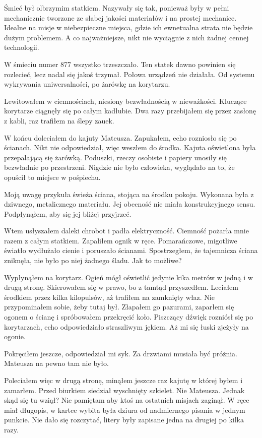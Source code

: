 \divider{}

Śmieć był olbrzymim statkiem. 
Nazywały się tak, ponieważ były w pełni mechanicznie tworzone ze słabej jakości materiałów i na prostej mechanice.
Idealne na misje w niebezpieczne miejsca, gdzie ich ewnetualna strata nie będzie dużym problemem. 
A co najważniejsze, nikt nie wyciągnie z nich żadnej cennej technologii.

W śmieciu numer 877 wszystko trzeszczało. 
Ten statek dawno powinien się rozlecieć, lecz nadal się jakoś trzymał.
Połowa urządzeń nie działała. Od systemu wykrywania uniwersalności, po żarówkę na korytarzu.

Lewitowałem w ciemnościach, niesiony bezwładnością w nieważkości.
Kluczące korytarze ciągnęły się po całym kadłubie.
Dwa razy przebijałem się przez zasłonę z kabli, raz trafiłem na ślepy zauek.

W końcu doleciałem do kajuty Mateusza. 
Zapukałem, echo rozniosło się po ścianach.
Nikt nie odpowiedział, więc weszłem do środka.
Kajuta oświetlona była przepalającą się żarówką.
Poduszki, rzeczy osobiste i papiery unosiły się bezwładnie po przestrzeni.
Nigdzie nie było człowieka, wyglądało na to, że opuścił to miejsce w pośpiechu.

Moją uwagę przykuła świeża ściana, stojąca na środku pokoju.
Wykonana była z dziwnego, metalicznego materiału.
Jej obecność nie miała konstrukcyjnego sensu.
Podpłynąłem, aby się jej bliżej przyjrzeć.

Wtem usłyszałem daleki chrobot i padła elektryczność.
Ciemność pożarła mnie razem z całym statkiem.
Zapaliłem ognik w ręce. Pomarańczowe, migotliwe światło wydłużało cienie i poruszało ścianami.
Spostrzegłem, że tajemnicza ściana zniknęła, nie było po niej żadnego śladu.
Jak to możliwe?

Wypłynąłem na korytarz.
Ogień mógł oświetlić jedynie kika metrów w jedną i w drugą stronę.
Skierowałem się w prawo, bo z tamtąd przyszedłem.
Leciałem środkiem przez kilka kilopulsów, aż trafiłem na zamknięty właz. 
Nie przypominałem sobie, żeby tutaj był. 
Złapałem go pazurami, zaparłem się ogonem o ścianę i spróbowałem przekręcić koło. 
Piszczący dźwięk rozniósł się po korytarzach, echo odpowiedziało straszliwym jękiem. 
Aż mi się łuski zjeżyły na ogonie.

Pokręciłem jeszcze, odpowiedział mi syk. 
Za drzwiami musiała być próżnia.
Mateusza na pewno tam nie było.

Poleciałem więc w drugą stronę, minąłem jeszcze raz kajutę w której byłem i zamarłem.
Przed biurkiem siedział wyschnięty szkielet. Nie Mateusza.
Jednak skąd się tu wziął? Nie pamiętam aby ktoś na ostatnich misjach zaginął. 
W ręce miał długopis, w kartce wybita była dziura od nadmiernego pisania w jednym punkcie. 
Nie dało się rozczytać, litery były zapisane jedna na drugiej po kilka razy.

